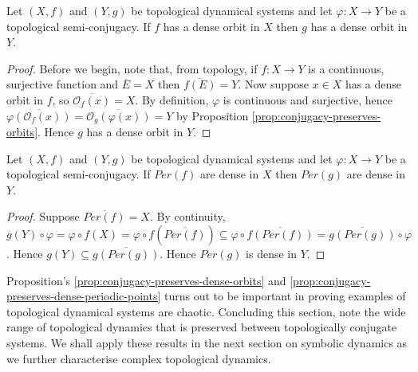\begin{prop} \label{prop:conjugacy-preserves-dense-orbits}
    Let $(X, f)$ and $(Y, g)$ be topological dynamical systems and let $\varphi: X \to Y$ be a topological semi-conjugacy. If $f$ has a dense orbit in $X$ then $g$ has a dense orbit in $Y$.
    \begin{proof}
        Before we begin, note that, from topology, if $f: X \to Y$ is a continuous, surjective function and $\overline{E} = X$ then $\overline{f(E)} = Y$. Now suppose $x \in X$ has a dense orbit in $f$, so $\overline{\mathcal{O}_f(x)} = X$. By definition, $\varphi$ is continuous and surjective, hence $\overline{\varphi(\mathcal{O}_{f}(x))} = \overline{\mathcal{O}_{g}(\varphi(x))} = Y$ by Proposition \ref{prop:conjugacy-preserves-orbits}. Hence $g$ has a dense orbit in $Y$.
    \end{proof}
\end{prop}

\begin{prop} \label{prop:conjugacy-preserves-dense-periodic-points}
    Let $(X, f)$ and $(Y,g)$ be topological dynamical systems and let $\varphi: X \to Y$ be a topological semi-conjugacy. If $Per(f)$ are dense in $X$ then $Per(g)$ are dense in $Y$.
    \begin{proof}
        Suppose $\overline{Per(f)} = X$. By continuity, $g(Y) \circ \varphi = \varphi \circ f(X) = \varphi \circ f(\overline{Per(f)}) \subseteq \varphi \circ \overline{f(Per(f))} = \overline{g(Per(g))} \circ \varphi$. Hence $g(Y) \subseteq \overline{g(Per(g))}$. Hence $Per(g)$ is dense in $Y$.
    \end{proof}
\end{prop}

Proposition's \ref{prop:conjugacy-preserves-dense-orbits} and \ref{prop:conjugacy-preserves-dense-periodic-points} turns out to be important in proving examples of topological dynamical systems are chaotic. Concluding this section, note the wide range of topological dynamics that is preserved between topologically conjugate systems. We shall apply these results in the next section on symbolic dynamics as we further characterise complex topological dynamics.

